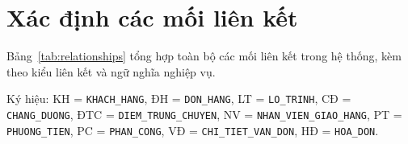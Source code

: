 \documentclass[11pt]{report}
\begin{document}

\section{Xác định các mối liên kết}
\label{sec:moilienket}

Bảng~\ref{tab:relationships} tổng hợp toàn bộ các mối liên kết trong hệ thống, kèm theo kiểu liên kết và ngữ nghĩa nghiệp vụ. 

Ký hiệu: KH = \texttt{KHACH\_HANG}, ĐH = \texttt{DON\_HANG}, LT = \texttt{LO\_TRINH}, CĐ = \texttt{CHANG\_DUONG}, ĐTC = \texttt{DIEM\_TRUNG\_CHUYEN}, NV = \texttt{NHAN\_VIEN\_GIAO\_HANG}, PT = \texttt{PHUONG\_TIEN}, PC = \texttt{PHAN\_CONG}, VĐ = \texttt{CHI\_TIET\_VAN\_DON}, HĐ = \texttt{HOA\_DON}.
\end{document}
